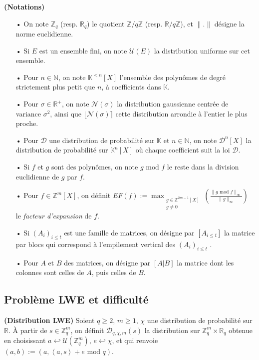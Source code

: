 \documentclass[11pt,a4paper]{article}
\begin{document}
\begin{defin}\textbf{(Notations)}
\begin{itemize}
\item[•] On note $\mathbb{Z}_q$ (resp. $\mathbb{R}_q$) le quotient $\mathbb{Z}/q\mathbb{Z}$ (resp. $\mathbb{R}/q\mathbb{Z}$), et $\|.\|$ désigne la norme euclidienne.
\item[•] Si $E$ est un ensemble fini, on note $\mathcal{U}(E)$ la distribution uniforme sur cet ensemble.
\item[•] Pour $n\in \mathbb{N}$, on note $\mathbb{K}^{<n}[X]$ l'ensemble des polynômes de degré strictement plus petit que $n$, à coefficients dans $\mathbb{K}$.
\item[•] Pour $\sigma \in \mathbb{R}^+$, on note $\mathcal{N}(\sigma)$ la distribution gaussienne centrée de variance $\sigma^2$, ainsi que $\lfloor \mathcal{N}(\sigma)\rceil$ cette distribution arrondie à l'entier le plus proche.
\item[•] Pour $\mathcal{D}$ une distribution de probabilité sur $\mathbb{K}$ et $n\in \mathbb{N}$, on note $\mathcal{D}^n[X]$ la distribution de probabilité sur $\mathbb{K}^n[X]$ où chaque coefficient suit la loi $\mathcal{D}$.
\item[•] Si $f$ et $g$ sont des polynômes, on note $g \text{ mod } f$ le reste dans la division euclidienne de $g$ par $f$.
\item[•] Pour $f \in \mathbb{Z}^m[X]$, on définit $EF(f) :=\displaystyle \max_{\substack{g\in \mathbb{Z}^{2m-1}[X] \\ g \neq 0}}(\frac{\|g\text{ mod }f \|_\infty}{\|g\|_\infty})$ le \textit{facteur d'expansion} de $f$.
\item[•] Si $(A_i)_{i \leq t}$ est une famille de matrices, on désigne par $[A_{i\leq t}]$ la matrice par blocs qui correspond à l'empilement vertical des  $(A_i)_{i \leq t}$ .
\item[•] Pour $A$ et $B$ des matrices, on désigne par $[A|B]$ la matrice dont les colonnes sont celles de $A$, puis celles de $B$. 
\end{itemize}
\end{defin}

\subsection{Problème LWE et difficulté}

\begin{defin}\textbf{(Distribution LWE)}
Soient $q\geq 2$, $m\geq 1$, $\chi$ une distribution de probabilité sur $\mathbb{R}$. À partir de $s\in \mathbb{Z}_q^m$, on définit $\mathcal{D}_{q,\chi,m}(s)$ la distribution sur $\mathbb{Z}_q^m\times\mathbb{R}_q$ obtenue en choisissant $a \hookleftarrow \mathcal{U}(\mathbb{Z}_q^m)$, $e\hookleftarrow \chi$, et qui renvoie $(a,b):=(a,\left<a,s\right> +e \text{ mod } q)$.
\end{defin}
\end{document}
